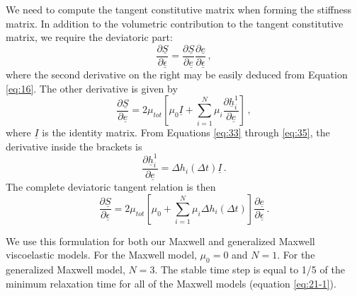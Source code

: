 We need to compute the tangent constitutive matrix when forming the
stiffness matrix. In addition to the volumetric contribution to the
tangent constitutive matrix, we require the deviatoric part:
\begin{equation}
\frac{\partial\underline{S}}{\partial\underline{\epsilon}}=\frac{\partial\underline{S}}{\partial\underline{e}}\frac{\partial\underline{e}}{\partial\underline{\epsilon}}\,,\label{eq:38}
\end{equation}
where the second derivative on the right may be easily deduced from
Equation \vref{eq:16}. The other derivative is given by
\begin{equation}
\frac{\partial\underline{S}}{\partial\underline{e}}=2\mu_{tot}\left[\mu_{0}\underline{I}+\sum_{i=1}^{N}\mu_{i}\frac{\partial\underline{h}_{i}^{1}}{\partial\underline{e}}\right]\,,\label{eq:39}
\end{equation}
where $\underline{I}$ is the identity matrix. From Equations \vref{eq:33}
through \vref{eq:35}, the derivative inside the brackets is
\begin{equation}
\frac{\partial\underline{h}_{i}^{1}}{\partial\underline{e}}=\Delta h_{i}\left(\Delta t\right)\underline{I}\,.\label{eq:40}
\end{equation}
The complete deviatoric tangent relation is then
\begin{equation}
\frac{\partial\underline{S}}{\partial\underline{\epsilon}}=2\mu_{tot}\left[\mu_{0}+\sum_{i=1}^{N}\mu_{i}\Delta h_{i}\left(\Delta t\right)\right]\frac{\partial\underline{e}}{\partial\underline{\epsilon}}\,.\label{eq:41}
\end{equation}


We use this formulation for both our Maxwell and generalized Maxwell
viscoelastic models. For the Maxwell model, $\mu_{0}=0$ and $N=1$.
For the generalized Maxwell model, $N=3.$ The stable time step is
equal to 1/5 of the minimum relaxation time for all of the Maxwell
models (equation \vref{eq:21-1}).

